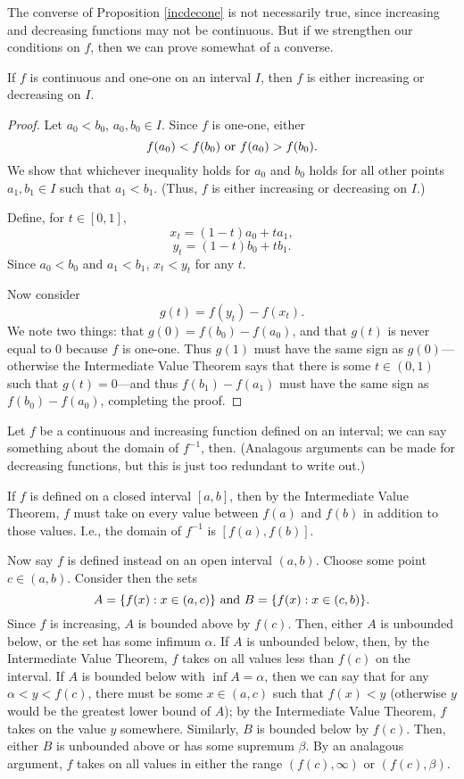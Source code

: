 The converse of Proposition \ref{incdecone} is not necessarily true, since increasing and decreasing functions may not be continuous. But if we strengthen our conditions on $f$, then we can prove somewhat of a converse. 

\begin{theorem} \label{contoneonemeansincdec}
If $f$ is continuous and one-one on an interval $I$, then $f$ is either increasing or decreasing on $I$.

\begin{proof}
Let $a_0 < b_0$, $a_0, b_0 \in I$. Since $f$ is one-one, either
\[ f(a_0) < f(b_0)\ \rmor\ f(a_0) > f(b_0). \]
We show that whichever inequality holds for $a_0$ and $b_0$ holds for all other points $a_1, b_1 \in I$ such that $a_1 < b_1$. (Thus, $f$ is either increasing or decreasing on $I$.) 

Define, for $t \in [0, 1]$,
\[ x_t = (1-t)a_0 + ta_1, \]
\[ y_t = (1-t)b_0 + tb_1. \]
Since $a_0 < b_0$ and $a_1 < b_1$, $x_t < y_t$ for any $t$. 

Now consider
\[ g(t) = f(y_t) - f(x_t). \]
We note two things: that $g(0) = f(b_0) - f(a_0)$, and that $g(t)$ is never equal to 0 because $f$ is one-one. Thus $g(1)$ must have the same sign as $g(0)$---otherwise the Intermediate Value Theorem says that there is some $t \in (0, 1)$ such that $g(t) = 0$---and thus $f(b_1) - f(a_1)$ must have the same sign as $f(b_0) - f(a_0)$, completing the proof.
\end{proof}
\end{theorem}

Let $f$ be a continuous and increasing function defined on an interval; we can say something about the domain of $f^{-1}$, then. (Analagous arguments can be made for decreasing functions, but this is just too redundant to write out.)

If $f$ is defined on a closed interval $[a, b]$, then by the Intermediate Value Theorem, $f$ must take on every value between $f(a)$ and $f(b)$ in addition to those values. I.e., the domain of $f^{-1}$ is $[f(a), f(b)]$.

Now say $f$ is defined instead on an open interval $(a, b)$. Choose some point $c \in (a, b)$. Consider then the sets 
\[ A = \{f(x): x \in (a, c)\}\ \textrm{and}\ B = \{f(x): x \in (c, b)\}. \]
Since $f$ is increasing, $A$ is bounded above by $f(c)$. Then, either $A$ is unbounded below, or the set has some infimum $\alpha$. If $A$ is unbounded below, then, by the Intermediate Value Theorem, $f$ takes on all values less than $f(c)$ on the interval. If $A$ is bounded below with $\inf A = \alpha$, then we can say that for any $\alpha < y < f(c)$, there must be some $x \in (a, c)$ such that $f(x) < y$ (otherwise $y$ would be the greatest lower bound of $A$); by the Intermediate Value Theorem, $f$ takes on the value $y$ somewhere. Similarly, $B$ is bounded below by $f(c)$. Then, either $B$ is unbounded above or has some supremum $\beta$. By an analagous argument, $f$ takes on all values in either the range $(f(c), \infty)$ or $(f(c), \beta)$.

